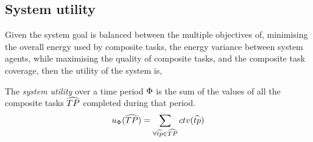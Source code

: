 \subsection{System utility}
\newcommand{\functionSystemUtility}[2]{\functionSignature{u_{\setTime{}{}}}{\setCompositeTask{}{}}}
Given the system goal is balanced between the multiple objectives of, minimising the overall energy used by composite tasks, the energy variance between system agents, while maximising the quality of composite tasks, and the composite task coverage, then the utility of the system is,

\begin{definition}
	The \textit{system utility} over a time period $\Phi$ is the sum of the values of all the composite tasks $\setCompositeTask{}{}$ completed during that period.
	\begin{equation}
		\functionSystemUtility{}{} = \sum_{\forall \varCompositeTask{}{} \in \setCompositeTask{}{}}
		\functionCompositeTaskValue{}{}
	\end{equation}
\end{definition}

